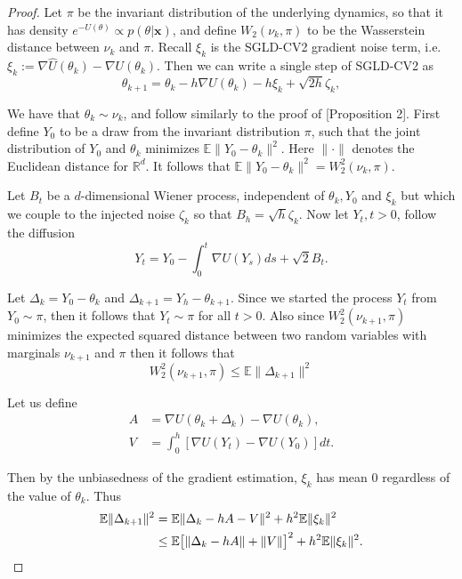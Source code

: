 \begin{proof}
Let $\pi$ be the invariant distribution of the underlying dynamics, so that it has density $e^{-U(\theta)} \propto p(\theta|\mathbf{x})$, and define $W_2(\nu_k, \pi)$ to be the Wasserstein distance between $\nu_k$ and $\pi$. Recall $\xi_k$ is the SGLD-CV2 gradient noise term, i.e. $\xi_k := \nabla \hat{U}(\theta_k) - \nabla U(\theta_k)$. Then we can write a single step of SGLD-CV2 as
\begin{equation}\label{eq:update-rule}
    \theta_{k+1} = \theta_k - h\nabla U(\theta_k) - h\xi_k + \sqrt{2h}\zeta_k,
\end{equation}

We have that $\theta_k \sim \nu_k$, and follow similarly to the proof of \citet{dalalyan2017}[Proposition 2]. First define $Y_0$ to be a draw from the invariant distribution $\pi$, such that the joint distribution of $Y_0$ and $\theta_k$ minimizes $\mathbb{E}\|Y_0 - \theta_k\|^2$. Here $\|\cdot\|$ denotes the Euclidean distance for $\mathbb{R}^d$. It follows that $\mathbb{E}\|Y_0 - \theta_k\|^2 = W_2^2(\nu_k, \pi)$.

Let $B_t$ be a $d$-dimensional Wiener process, independent of $\theta_k, Y_0$ and $\xi_k$ but which we couple to the injected noise $\zeta_k$ so that $B_h = \sqrt{h}\zeta_k$. Now let $Y_t, t > 0$, follow the diffusion
\begin{equation}
    Y_t = Y_0 - \int_0^t \nabla U(Y_s)ds + \sqrt{2}B_t.
\end{equation}

Let $\Delta_k = Y_0 - \theta_k$ and $\Delta_{k+1} = Y_h - \theta_{k+1}$. Since we started the process $Y_t$ from $Y_0 \sim \pi$, then it follows that $Y_t \sim \pi$ for all $t > 0$. Also since $W_2^2(\nu_{k+1}, \pi)$ minimizes the expected squared distance between two random variables with marginals $\nu_{k+1}$ and $\pi$ then it follows that
\begin{equation}
    W_2^2(\nu_{k+1}, \pi) \leq \mathbb{E}\|\Delta_{k+1}\|^2 \tag{$\star$}\label{eq:wass-id}
\end{equation}

Let us define
\begin{align}
    A &= \nabla U(\theta_k + \Delta_k) - \nabla U(\theta_k), \\
    V &= \int_0^h [\nabla U(Y_t) - \nabla U(Y_0)]dt.
\end{align}

Then by the unbiasedness of the gradient estimation, $\xi_k$ has mean 0 regardless of the value of $\theta_k$. Thus
\begin{align}
    \mathbb{E}\|\Delta_{k+1}\|^2 &= \mathbb{E}\|\Delta_k - hA - V\|^2 + h^2\mathbb{E}\|\xi_k\|^2 \notag \\
    &\leq \mathbb{E}\big[\|\Delta_k - hA\| + \|V\|\big]^2 + h^2\mathbb{E}\|\xi_k\|^2.
\end{align}


\end{proof}
